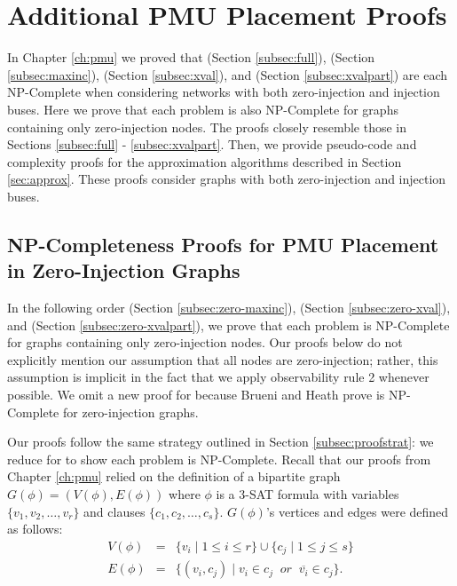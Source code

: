 \chapter{Additional PMU Placement Proofs}
\label{ch:appendix-pmu}


In Chapter \ref{ch:pmu} we proved that \full (Section \ref{subsec:full}), \maxinc (Section \ref{subsec:maxinc}), \xval (Section \ref{subsec:xval}),
and \xvalpart (Section \ref{subsec:xvalpart}) are each NP-Complete when considering networks with both zero-injection and injection buses.  Here we prove that each problem is also NP-Complete
for graphs containing only zero-injection nodes.  The proofs closely resemble those in Sections \ref{subsec:full} - \ref{subsec:xvalpart}. %
Then, we provide pseudo-code and complexity proofs for the approximation algorithms described in Section \ref{sec:approx}.  These proofs consider graphs with both zero-injection and injection buses. 



\section{NP-Completeness Proofs for PMU Placement in Zero-Injection Graphs}

In the following order \maxinc (Section \ref{subsec:zero-maxinc}), \xval (Section \ref{subsec:zero-xval}), and \xvalpart (Section \ref{subsec:zero-xvalpart}), 
we prove that each problem is NP-Complete for graphs containing only zero-injection nodes.  Our proofs below do not explicitly mention our assumption that all nodes 
are zero-injection; rather, %
this assumption is implicit in the fact that we apply observability rule 2 whenever possible.
We omit a new proof for \full because Brueni and Heath \cite{Brueni05} prove \full is NP-Complete for zero-injection graphs.  

Our proofs follow the same strategy outlined in Section \ref{subsec:proofstrat}: we reduce for \sat to show each problem is NP-Complete.  
Recall that our proofs from Chapter \ref{ch:pmu} relied on the definition of a bipartite 
graph $G(\phi)=(V(\phi),E(\phi))$ where $\phi$ is a 3-SAT formula with variables $\{v_1,v_2, \dots , v_r\}$ and clauses $\{c_1,c_2, \dots , c_s \}$.  
$G(\phi)$'s vertices and edges were defined as follows:
\begin{eqnarray*}
 V(\phi) &= &\{v_i\; \vert\; 1 \leq i \leq r \} \cup \{c_j \;\vert\; 1 \leq j \leq s \} \\
 E(\phi) &=& \{ (v_i,c_j)\;\vert\; v_i \in c_j\;\; or \;\; \overline{v_i} \in c_j\}.
\end{eqnarray*}


